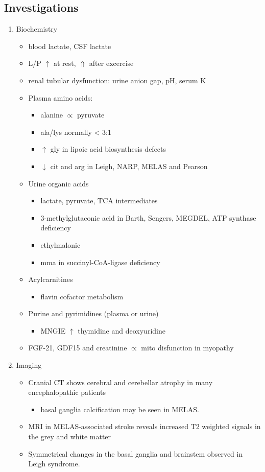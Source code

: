 \documentclass{scrartcl}
\begin{document}
\subsection{Investigations}
\label{sec:org437e37c}

\begin{enumerate}
\item Biochemistry
\label{sec:orgdf59c18}
\begin{itemize}
\item blood lactate, CSF lactate
\item L/P \(\uparrow\) at rest, \(\Uparrow\) after excercise
\item renal tubular dysfunction: urine anion gap, pH, serum K
\item Plasma amino acids:
\begin{itemize}
\item alanine \(\propto\) pyruvate
\item ala/lys normally \textless{} 3:1
\item \(\uparrow\) gly in lipoic acid biosynthesis defects
\item \(\downarrow\) cit and arg in Leigh, NARP, MELAS and Pearson
\end{itemize}
\item Urine organic acids
\begin{itemize}
\item lactate, pyruvate, TCA intermediates
\item 3-methylglutaconic acid in Barth, Sengers, MEGDEL, ATP synthase deficiency
\item ethylmalonic
\item mma in succinyl-CoA-ligase deficiency
\end{itemize}
\item Acylcarnitines
\begin{itemize}
\item flavin cofactor metabolism
\end{itemize}
\item Purine and pyrimidines (plasma or urine)
\begin{itemize}
\item MNGIE \(\uparrow\) thymidine and deoxyuridine
\end{itemize}
\item FGF-21, GDF15 and creatinine \(\propto\) mito disfunction in myopathy
\end{itemize}

\item Imaging
\label{sec:org44b1138}
\begin{itemize}
\item Cranial CT shows cerebral and cerebellar atrophy in many encephalopathic patients
\begin{itemize}
\item basal ganglia calcification may be seen in MELAS.
\end{itemize}
\item MRI in MELAS-associated stroke reveals increased T2 weighted signals in the grey and white matter
\item Symmetrical changes in the basal ganglia and brainstem observed in Leigh syndrome.
\end{itemize}


\end{enumerate}
\end{document}
